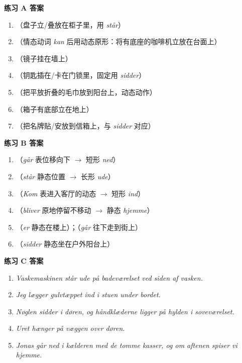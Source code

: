 \begin{answerbox}
\textbf{练习 A 答案}
\begin{enumerate}
  \item {}（盘子立/叠放在柜子里，用 \textit{står}）
  \item {}（情态动词 \textit{kan} 后用动态原形：将有底座的咖啡机立放在台面上）
  \item {}（镜子挂在墙上）
  \item {}（钥匙插在/卡在门锁里，固定用 \textit{sidder}）
  \item {}（把平放折叠的毛巾放到阳台上，动态动作）
  \item {}（箱子有底部立在地上）
  \item {}（把名牌贴/安放到信箱上，与 \textit{sidder} 对应）
\end{enumerate}

\textbf{练习 B 答案}
\begin{enumerate}
  \item {}（\textit{går} 表位移向下 $\rightarrow$ 短形 \textit{ned}）
  \item {}（\textit{står} 静态位置 $\rightarrow$ 长形 \textit{ude}）
  \item {}（\textit{Kom} 表进入客厅的动态 $\rightarrow$ 短形 \textit{ind}）
  \item {}（\textit{bliver} 原地停留不移动 $\rightarrow$ 静态 \textit{hjemme}）
  \item {}（\textit{er} 静态在楼上）；（\textit{går} 往下走到街上）
  \item {}（\textit{sidder} 静态坐在户外阳台上）
\end{enumerate}

\textbf{练习 C 答案}
\begin{enumerate}
  \item \textit{Vaskemaskinen står ude på badeværelset ved siden af vasken.}
  \item \textit{Jeg lægger gulvtæppet ind i stuen under bordet.}
  \item \textit{Nøglen sidder i døren, og håndklæderne ligger på hylden i soveværelset.}
  \item \textit{Uret hænger på væggen over døren.}
  \item \textit{Jonas går ned i kælderen med de tomme kasser, og om aftenen spiser vi hjemme.}
\end{enumerate}


\end{answerbox}
